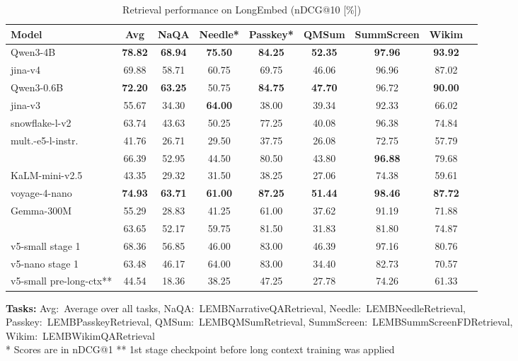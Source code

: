\documentclass[11pt]{article}
\begin{document}
\begin{table}[H]
\caption{Retrieval performance on LongEmbed (nDCG@10 [\%])}
\label{tab:longembed}
\centering
\small
\begin{tabular}{@{}lcccccccc@{}}
\toprule
\textbf{Model} & \textbf{Avg} & \textbf{NaQA} & \textbf{Needle*} & \textbf{Passkey*} & \textbf{QMSum} & \textbf{SummScreen} & \textbf{Wikim} \\ 
\midrule
Qwen3-4B & \textbf{78.82} & \textbf{68.94} & \textbf{75.50} & \textbf{84.25} & \textbf{52.35} & \textbf{97.96} & \textbf{93.92} \\
jina-v4 & 69.88 & 58.71 & 60.75 & 69.75 & 46.06 & 96.96 & 87.02 \\
\midrule
Qwen3-0.6B & \textbf{72.20} & \textbf{63.25} & 50.75 & \textbf{84.75} & \textbf{47.70} & 96.72 & \textbf{90.00} \\
jina-v3 & 55.67 & 34.30 & \textbf{64.00} & 38.00 & 39.34 & 92.33 & 66.02 \\
snowflake-l-v2 & 63.74 & 43.63 & 50.25 & 77.25 & 40.08 & 96.38 & 74.84 \\
mult.-e5-l-instr. & 41.76 & 26.71 & 29.50 & 37.75 & 26.08 & 72.75 & 57.79 \\
\JEmbeddingVFiveTextSmallShort{} & 66.39 & 52.95 & 44.50 & 80.50 & 43.80 & \textbf{96.88} & 79.68 \\
\midrule
KaLM-mini-v2.5 & 43.35 & 29.32 & 31.50 & 38.25 & 27.06 & 74.38 & 59.61 \\
voyage-4-nano & \textbf{74.93} & \textbf{63.71} & \textbf{61.00} & \textbf{87.25} & \textbf{51.44} & \textbf{98.46} & \textbf{87.72} \\
Gemma-300M & 55.29 & 28.83 & 41.25 & 61.00 & 37.62 & 91.19 & 71.88 \\
\JEmbeddingVFiveTextNanoShort{} & 63.65 & 52.17 & 59.75 & 81.50 & 31.83 & 81.80 & 74.87 \\
\midrule
v5-small stage 1 & 68.36 & 56.85 & 46.00 & 83.00 & 46.39 & 97.16 & 80.76 \\
v5-nano stage 1 & 63.48 & 46.17 & 64.00 & 83.00 & 34.40 & 82.73 & 70.57 \\
v5-small pre-long-ctx** & 44.54 & 18.36 & 38.25 & 47.25 & 27.78 & 74.26 & 61.33 \\
\bottomrule
\end{tabular}
\medskip
\begin{flushleft}
\textbf{Tasks:} Avg:~Average over all tasks, NaQA:~LEMBNarrativeQARetrieval, Needle:~LEMBNeedleRetrieval, Passkey:~LEMBPasskeyRetrieval, QMSum:~LEMBQMSumRetrieval, SummScreen:~LEMBSummScreenFDRetrieval, Wikim:~LEMBWikimQARetrieval \\
* Scores are in nDCG@1 \quad
** 1st stage checkpoint before long context training was applied 
\end{flushleft}
\end{table}
\end{document}
